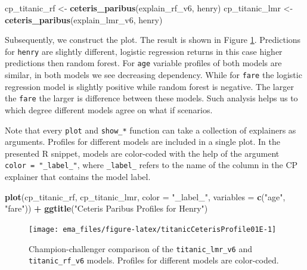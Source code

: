 \documentclass[]{krantz}
\newenvironment{Shaded}{\begin{snugshade}}{\end{snugshade}}
\newcommand{\DataTypeTok}[1]{\textcolor[rgb]{0.13,0.29,0.53}{#1}}
\newcommand{\KeywordTok}[1]{\textcolor[rgb]{0.13,0.29,0.53}{\textbf{#1}}}
\newcommand{\NormalTok}[1]{#1}
\newcommand{\OperatorTok}[1]{\textcolor[rgb]{0.81,0.36,0.00}{\textbf{#1}}}
\newcommand{\StringTok}[1]{\textcolor[rgb]{0.31,0.60,0.02}{#1}}
\begin{document}
\begin{Shaded}
\begin{Highlighting}[]
\NormalTok{cp_titanic_rf <-}\StringTok{ }\KeywordTok{ceteris_paribus}\NormalTok{(explain_rf_v6, henry)}
\NormalTok{cp_titanic_lmr <-}\StringTok{ }\KeywordTok{ceteris_paribus}\NormalTok{(explain_lmr_v6, henry)}
\end{Highlighting}
\end{Shaded}

Subsequently, we construct the plot. The result is shown in Figure \ref{fig:titanicCeterisProfile01E}. Predictions for \texttt{henry} are slightly different, logistic regression returns in this case higher predictions then random forest. For \texttt{age} variable profiles of both models are similar, in both models we see decreasing dependency. While for \texttt{fare} the logistic regression model is slightly positive while random forest is negative. The larger the \texttt{fare} the larger is difference between these models. Such analysis helps us to which degree different models agree on what if scenarios.

Note that every \texttt{plot} and \texttt{show\_*} function can take a collection of explainers as arguments. Profiles for different models are included in a single plot. In the presented R snippet, models are color-coded with the help of the argument \texttt{color\ =\ "\_label\_"}, where \texttt{\_label\_} refers to the name of the column in the CP explainer that contains the model label.



\begin{Shaded}
\begin{Highlighting}[]
\KeywordTok{plot}\NormalTok{(cp_titanic_rf, cp_titanic_lmr, }\DataTypeTok{color =} \StringTok{"_label_"}\NormalTok{, }
     \DataTypeTok{variables =} \KeywordTok{c}\NormalTok{(}\StringTok{"age"}\NormalTok{, }\StringTok{"fare"}\NormalTok{)) }\OperatorTok{+}
\StringTok{     }\KeywordTok{ggtitle}\NormalTok{(}\StringTok{"Ceteris Paribus Profiles for Henry"}\NormalTok{)}
\end{Highlighting}
\end{Shaded}

\begin{figure}

{\centering \texttt{[image: ema\_files/figure-latex/titanicCeterisProfile01E-1]} 

}

\caption{Champion-challenger comparison of the \texttt{titanic\_lmr\_v6} and \texttt{titanic\_rf\_v6} models. Profiles for different models are color-coded.}\label{fig:titanicCeterisProfile01E}
\end{figure}
\end{document}
